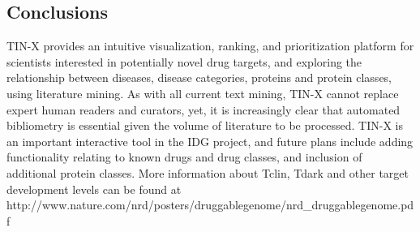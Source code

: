 \subsection{Conclusions}

TIN-X provides an intuitive visualization, ranking, and prioritization platform for scientists interested in potentially novel drug targets, and exploring the relationship between diseases, disease categories, proteins and protein classes, using literature mining.  As with all current text mining, TIN-X cannot replace expert human readers and curators, yet, it is increasingly clear that automated bibliometry is essential given the volume of literature to be processed.  TIN-X is an important interactive tool in the IDG project, and future plans include adding functionality relating to known drugs and drug classes, and inclusion of additional protein classes. More information about Tclin, Tdark and other target development levels can be found at http://www.nature.com/nrd/posters/druggablegenome/nrd\_druggablegenome.pdf
